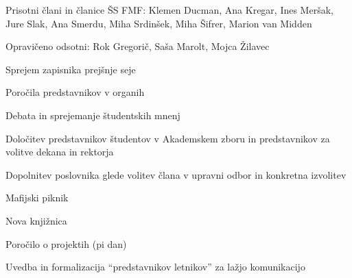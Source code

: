 \documentclass{seja}
\begin{document}
Prisotni člani in članice ŠS FMF: Klemen Ducman, Ana Kregar, Ines Meršak, Jure Slak, Ana Smerdu, Miha Srdinšek, Miha Šifrer, Marion van Midden

Opravičeno odsotni: Rok Gregorič, Saša Marolt, Mojca Žilavec

\begin{red*}
\item Sprejem zapisnika prejšnje seje
\item Poročila predstavnikov v organih
\item Debata in sprejemanje študentskih mnenj
\item Določitev predstavnikov študentov v Akademskem zboru in predstavnikov za volitve dekana in rektorja
\item Dopolnitev poslovnika glede volitev člana v upravni odbor in konkretna izvolitev
\item Mafijski piknik
\item Nova knjižnica
\item Poročilo o projektih (pi dan)
\item Uvedba in formalizacija ``predstavnikov letnikov'' za lažjo komunikacijo
\end{red*}
\end{document}
